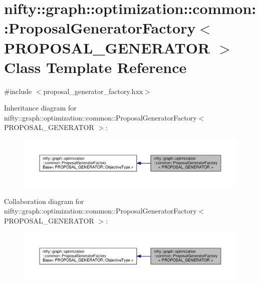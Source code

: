 \hypertarget{classnifty_1_1graph_1_1optimization_1_1common_1_1ProposalGeneratorFactory}{}\section{nifty\+:\+:graph\+:\+:optimization\+:\+:common\+:\+:Proposal\+Generator\+Factory$<$ P\+R\+O\+P\+O\+S\+A\+L\+\_\+\+G\+E\+N\+E\+R\+A\+T\+O\+R $>$ Class Template Reference}
\label{classnifty_1_1graph_1_1optimization_1_1common_1_1ProposalGeneratorFactory}


{\ttfamily \#include $<$proposal\+\_\+generator\+\_\+factory.\+hxx$>$}



Inheritance diagram for nifty\+:\+:graph\+:\+:optimization\+:\+:common\+:\+:Proposal\+Generator\+Factory$<$ P\+R\+O\+P\+O\+S\+A\+L\+\_\+\+G\+E\+N\+E\+R\+A\+T\+O\+R $>$\+:\nopagebreak
\begin{figure}[H]
\begin{center}
\leavevmode
\includegraphics[width=350pt]{classnifty_1_1graph_1_1optimization_1_1common_1_1ProposalGeneratorFactory__inherit__graph}
\end{center}
\end{figure}


Collaboration diagram for nifty\+:\+:graph\+:\+:optimization\+:\+:common\+:\+:Proposal\+Generator\+Factory$<$ P\+R\+O\+P\+O\+S\+A\+L\+\_\+\+G\+E\+N\+E\+R\+A\+T\+O\+R $>$\+:\nopagebreak
\begin{figure}[H]
\begin{center}
\leavevmode
\includegraphics[width=350pt]{classnifty_1_1graph_1_1optimization_1_1common_1_1ProposalGeneratorFactory__coll__graph}
\end{center}
\end{figure}
